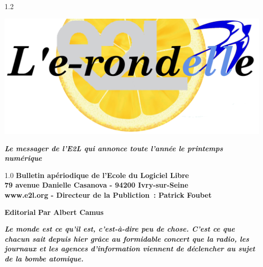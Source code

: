 \documentclass[francais,a4paper,oneside]{article}
\newenvironment{changemargin}[2]{\begin{list}{}{%
\setlength{\topsep}{0pt}%
\setlength{\leftmargin}{0pt}%
\setlength{\rightmargin}{0pt}%
\setlength{\listparindent}{\parindent}%
\setlength{\itemindent}{\parindent}%
\setlength{\parsep}{0pt plus 1pt}%
\addtolength{\leftmargin}{#1}%
\addtolength{\rightmargin}{#2}%
}\item }{\end{list}}
\begin{document}
\begin{spacing}{1.2}

\begin{center}
\includegraphics[scale=1.0]{pictures/logo-eRondelle.png}\\
\end{center}

\vspace{-3.5cm}

\begin{center}
    \textbf{\textit{\color{blue}
    Le messager de l'E2L qui annonce toute l'année le printemps numérique}}
    \begin{spacing}{1.0}
\vspace{0.2cm}
    \footnotesize{\textbf{
        Bulletin apériodique de l'Ecole du Logiciel Libre\\
        79 avenue Danielle Casanova - 94200 Ivry-sur-Seine\\
        www.e2l.org - Directeur de la Publiction~: Patrick Foubet}}
    \end{spacing}
\end{center}

\vspace{-0.8cm}
\begin{changemargin}{0.8cm}{0.0cm}
    \Huge{\color{RoyalBlue}\textbf{Editorial} \color{black}\large{\textbf{Par Albert Camus}}}
\vspace*{0.1cm}

\normalsize{}
\textbf{\textit{Le monde est ce qu'il est, c'est-à-dire peu de chose. C'est ce que
    chacun sait depuis hier grâce au formidable concert que la radio, les
    journaux et les agences d'information viennent de déclencher au sujet de la
    bombe atomique.}}
\end{changemargin}

\vspace*{-0.1cm}


\end{spacing}
\end{document}
